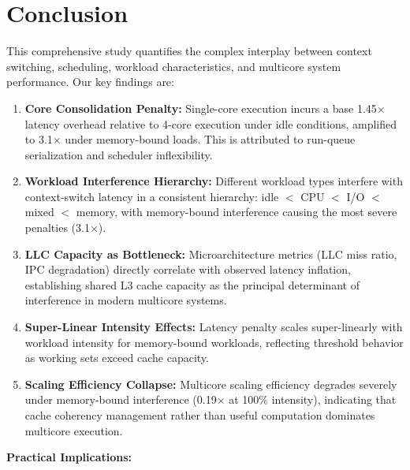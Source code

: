 \documentclass[conference]{IEEEtran}
\begin{document}
\section{Conclusion}
\label{sec:conclusion}

This comprehensive study quantifies the complex interplay between context
switching, scheduling, workload characteristics, and multicore system
performance. Our key findings are:

\begin{enumerate}
  \item \textbf{Core Consolidation Penalty:} Single-core execution incurs a
        base 1.45$\times$ latency overhead relative to 4-core execution under
        idle conditions, amplified to 3.1$\times$ under memory-bound loads.
        This is attributed to run-queue serialization and scheduler inflexibility.
  
  \item \textbf{Workload Interference Hierarchy:} Different workload types
        interfere with context-switch latency in a consistent hierarchy:
        idle $<$ CPU $<$ I/O $<$ mixed $<$ memory, with memory-bound
        interference causing the most severe penalties (3.1$\times$).
  
  \item \textbf{LLC Capacity as Bottleneck:} Microarchitecture metrics (LLC
        miss ratio, IPC degradation) directly correlate with observed latency
        inflation, establishing shared L3 cache capacity as the principal
        determinant of interference in modern multicore systems.
  
  \item \textbf{Super-Linear Intensity Effects:} Latency penalty scales
        super-linearly with workload intensity for memory-bound workloads,
        reflecting threshold behavior as working sets exceed cache capacity.
  
  \item \textbf{Scaling Efficiency Collapse:} Multicore scaling efficiency
        degrades severely under memory-bound interference (0.19$\times$ at 100\%
        intensity), indicating that cache coherency management rather than
        useful computation dominates multicore execution.
\end{enumerate}

\textbf{Practical Implications:}
\end{document}
